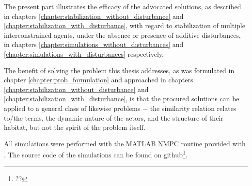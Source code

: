 The present part illustrates the efficacy of the advocated solutions, as
described in chapters \ref{chapter:stabilization_without_disturbance} and
\ref{chapter:stabilization_with_disturbance}, with regard to stabilization
of multiple interconstrained agents, under the absence or presence
of additive disturbances, in chapters
\ref{chapter:simulations_without_disturbances} and
\ref{chapter:simulations_with_disturbances} respectively.

The benefit of solving the problem this thesis addresses, as was formulated in
chapter \ref{chapter:prob_formulation} and approached in chapters
\ref{chapter:stabilization_without_disturbance} and
\ref{chapter:stabilization_with_disturbance}, is that the procured solutions can
be applied to a general class of likewise problems $-$ the similarity relation
relates to/the terms, the dynamic nature of the actors, and the structure of
their habitat, but not the spirit of the problem itself.

All simulations were performed with the MATLAB NMPC routine provided with
\cite{grune2016nonlinear}. The source code of the simulations can be found on
github\footnote{??}.
